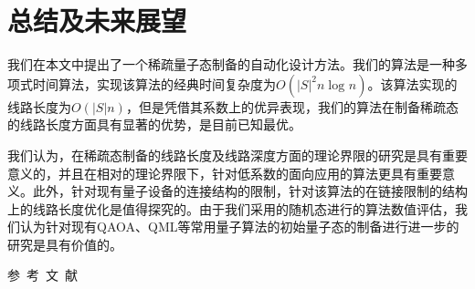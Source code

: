 \documentclass[10.5pt,compsoc,UTF8]{CjC}
\theoremstyle{mystyle}
\begin{document}


\section{\heiti 总结及未来展望}

我们在本文中提出了一个稀疏量子态制备的自动化设计方法。我们的算法是一种多项式时间算法，实现该算法的经典时间复杂度为$O\left ( \left |  S\right |^2 n \log_{}{n}  \right ) $。该算法实现的线路长度为$O\left ( \left |  S\right | n \right ) $，但是凭借其系数上的优异表现，我们的算法在制备稀疏态的线路长度方面具有显著的优势，是目前已知最优。

我们认为，在稀疏态制备的线路长度及线路深度方面的理论界限的研究是具有重要意义的，并且在相对的理论界限下，针对低系数的面向应用的算法更具有重要意义。此外，针对现有量子设备的连接结构的限制，针对该算法的在链接限制的结构上的线路长度优化是值得探究的。由于我们采用的随机态进行的算法数值评估，我们认为针对现有QAOA、QML等常用量子算法的初始量子态的制备进行进一步的研究是具有价值的。



\newpage

\vspace {10mm}
\centerline
{\textsf{参~考~文~献}}
 \addtolength{\itemsep}{-1em}
\vspace {1.5mm}









\end{document}
